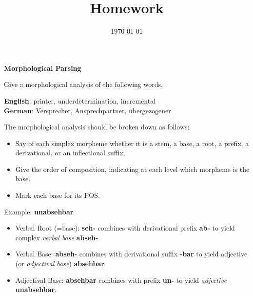 \documentclass[11pt]{article}
\title{Homework \hwnumber} %
\author{\myname} %
\date{\textbf{\mycourse} \hfill {\today} \hfill \textbf{\semesteryear}} %
\begin{document}
\thispagestyle{empty} %

\clearpage %
\maketitle


\begin{problem}{1}
\textbf{Morphological Parsing}

Give a morphological analysis of the following words,
\begin{tcolorbox}
	\textbf{English}: printer, underdetermination, incremental \\
	\textbf{German}: Versprecher, Ansprechpartner, {\"u}bergezogener
\end{tcolorbox}

The morphological analysis should be broken down as follows:
\begin{itemize}
	\item Say of each simplex morpheme whether it is a stem, a base, a root, a prefix, a derivational, or an inflectional suffix.
	\item Give the order of composition, indicating at each level which morpheme is the base.
	\item Mark each base for its POS.

\end{itemize}


Example: \textbf{unabsehbar}
\begin{itemize}
	\item Verbal Root (=base): \textbf{seh-} combines with derivational prefix \textbf{ab-} to yield complex \textit{verbal base} \textbf{abseh-}

	\item Verbal Base: \textbf{abseh-} combines with derivational suffix \textbf{-bar} to yield adjective (or \textit{adjectival base}) \textbf{absehbar}

	\item Adjectival Base: \textbf{absehbar} combines with prefix \textbf{un-} to yield \textit{adjective} \textbf{unabsehbar}. 
\end{itemize}

\end{problem}
\end{document}
